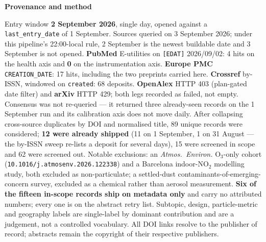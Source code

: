 \documentclass[10pt]{article}
\begin{document}
\vspace{4mm}
\begin{keybox}
{\sffamily\bfseries\footnotesize\color{Deep}Provenance and method}\\[1.2mm]
{\fontsize{7.2}{8.8}\selectfont
Entry window \textbf{2 September 2026}, single day, opened against a
\texttt{last\_entry\_date} of 1 September. Sources queried on 3 September 2026; under this
pipeline's 22:00-local rule, 2 September is the newest buildable date and 3 September is
not opened.
\textbf{PubMed} E-utilities on \texttt{[EDAT]} 2026/09/02: 4 hits on the health axis and
\textbf{0} on the instrumentation axis.
\textbf{Europe PMC} \texttt{CREATION\_DATE}: 17 hits, including the two preprints carried
here.
\textbf{Crossref} by-ISSN, windowed on \texttt{created}: 68 deposits.
\textbf{OpenAlex} HTTP 403 (plan-gated date filter) and \textbf{arXiv} HTTP 429; both legs
recorded as failed, not empty. Consensus was not re-queried --- it returned three
already-seen records on the 1 September run and its calibration axis does not move daily.
After collapsing cross-source duplicates by DOI and normalised title, 89 unique records
were considered; \textbf{12 were already shipped} (11 on 1 September, 1 on 31 August ---
the by-ISSN sweep re-lists a deposit for several days), 15 were screened in scope and 62
were screened out. Notable exclusions: an \textit{Atmos.\ Environ.} O$_3$-only cohort
(\texttt{10.1016/j.atmosenv.2026.122338}) and a Barcelona indoor-NO$_2$ modelling study,
both excluded as non-particulate; a settled-dust contaminants-of-emerging-concern survey,
excluded as a chemical rather than aerosol measurement.
\textbf{Six of the fifteen in-scope records ship on metadata only} and carry no attributed
numbers; every one is on the abstract retry list.
Subtopic, design, particle-metric and geography labels are single-label by dominant
contribution and are a judgement, not a controlled vocabulary. All DOI links resolve to
the publisher of record; abstracts remain the copyright of their respective publishers.\par}
\end{keybox}
\end{document}
